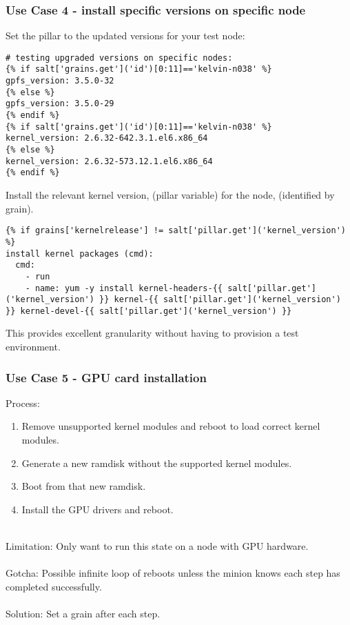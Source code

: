 \documentclass{beamer}
\begin{document}
\begin{frame}[fragile]
\frametitle{Use Case 4 - install specific versions on specific node}

Set the pillar to the updated versions for your test node:\\

\begin{lstlisting}[basicstyle=\tiny,]
# testing upgraded versions on specific nodes:
{% if salt['grains.get']('id')[0:11]=='kelvin-n038' %}
gpfs_version: 3.5.0-32
{% else %}
gpfs_version: 3.5.0-29
{% endif %}
{% if salt['grains.get']('id')[0:11]=='kelvin-n038' %}
kernel_version: 2.6.32-642.3.1.el6.x86_64
{% else %}
kernel_version: 2.6.32-573.12.1.el6.x86_64
{% endif %}
\end{lstlisting}

Install the relevant kernel version, (pillar variable) for the node, (identified by grain).

\begin{lstlisting}[basicstyle=\tiny,]
{% if grains['kernelrelease'] != salt['pillar.get']('kernel_version') %}
install kernel packages (cmd):
  cmd:
    - run
    - name: yum -y install kernel-headers-{{ salt['pillar.get']('kernel_version') }} kernel-{{ salt['pillar.get']('kernel_version') }} kernel-devel-{{ salt['pillar.get']('kernel_version') }}
\end{lstlisting}

This provides excellent granularity without having to provision a test environment.

\end{frame} 

\begin{frame}
\frametitle{Use Case 5 - GPU card installation}
Process:\\
\begin{enumerate}%
\item Remove unsupported kernel modules and reboot to load correct kernel modules.
\item Generate a new ramdisk without the supported kernel modules.
\item Boot from that new ramdisk.
\item Install the GPU drivers and reboot.\\~\\ %
\end{enumerate}

Limitation: Only want to run this state on a node with GPU hardware.\\~\\

Gotcha: Possible infinite loop of reboots unless the minion knows each step has completed successfully.\\~\\

Solution: Set a grain after each step.
\end{frame}
\end{document}

